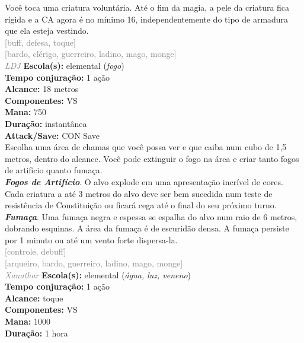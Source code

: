 \documentclass{RPG_Adventure}[2021/10/20]
\begin{document}
{\normalsize Você toca uma criatura voluntária. Até o fim da magia, a pele da criatura fica rígida e a CA agora é no mínimo 16, independentemente do tipo de armadura que ela esteja vestindo.\\}
{\scriptsize \textcolor{gray}{[buff, defesa, toque]\\}}
{\scriptsize \textcolor{gray}{[bardo, clérigo, guerreiro, ladino, mago, monge]\\}}
{\tiny \textcolor{gray}{\textit{LDJ}}}\jump{}
{\small \t \textbf{Escola(s):} elemental (\textit{fogo})\\\t \textbf{Tempo conjuração:} 1 ação\\\t \textbf{Alcance:} 18 metros\\\t \textbf{Componentes:} VS\\\t \textbf{Mana:} 750\\\t \textbf{Duração:} instantânea\\\t \textbf{Attack/Save:} CON Save\\}
{\normalsize Escolha uma área de chamas que você possa ver e que caiba num cubo de 1,5 metros, dentro do alcance. Você pode extinguir o fogo na área e criar tanto fogos de artificio quanto fumaça.\\\t \textbf{\textit{Fogos de Artifício}}. O alvo explode em uma apresentação incrível de cores. Cada criatura a até 3 metros do alvo deve ser bem sucedida num teste de resistência de Constituição ou ficará cega até o final do seu próximo turno.\\\t \textbf{\textit{Fumaça}}. Uma fumaça negra e espessa se espalha do alvo num raio de 6 metros, dobrando esquinas. A área da fumaça é de escuridão densa.  A fumaça persiste por 1 minuto ou até um vento forte dispersa-la.\\}
{\scriptsize \textcolor{gray}{[controle, debuff]\\}}
{\scriptsize \textcolor{gray}{[arqueiro, bardo, guerreiro, ladino, mago, monge]\\}}
{\tiny \textcolor{gray}{\textit{Xanathar}}}\jump{}
{\small \t \textbf{Escola(s):} elemental (\textit{água, luz, veneno})\\\t \textbf{Tempo conjuração:} 1 ação\\\t \textbf{Alcance:} toque\\\t \textbf{Componentes:} VS\\\t \textbf{Mana:} 1000\\\t \textbf{Duração:} 1 hora\\}
\end{document}
